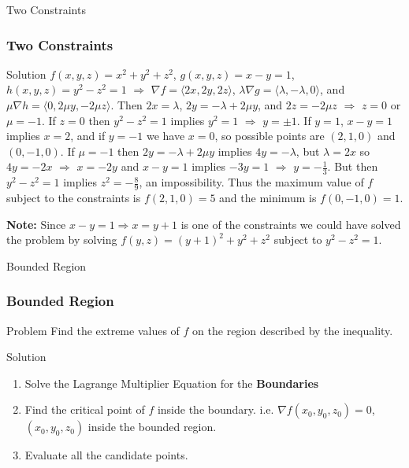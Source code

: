 \documentclass[aspectratio=169, UTF8]{beamer}
\begin{document}
\begin{frame}{Two Constraints}
    \frametitle{Two Constraints}
    \begin{block}{Solution}
        $f(x, y, z) = x^2 + y^2 + z^2$, $g(x, y, z) = x - y = 1$, $h(x, y, z) = y^2 - z^2 = 1$ $\Rightarrow$ $\nabla f = \langle 2x, 2y, 2z \rangle$, $\lambda \nabla g = \langle \lambda, -\lambda, 0 \rangle$, and $\mu \nabla h = \langle 0, 2\mu y, -2\mu z \rangle$. Then $2x = \lambda$, $2y = -\lambda + 2\mu y$, and $2z = -2\mu z$ $\Rightarrow$ $z = 0$ or $\mu = -1$.
If $z = 0$ then $y^2 - z^2 = 1$ implies $y^2 = 1$ $\Rightarrow$ $y = \pm 1$. If $y = 1$, $x - y = 1$ implies $x = 2$, and if $y = -1$ we have $x = 0$, so possible points are $(2, 1, 0)$ and $(0, -1, 0)$. If $\mu = -1$ then $2y = -\lambda + 2\mu y$ implies $4y = -\lambda$, but $\lambda = 2x$ so $4y = -2x$ $\Rightarrow$ $x = -2y$ and $x - y = 1$ implies $-3y = 1$ $\Rightarrow$ $y = -\frac{1}{3}$. But then $y^2 - z^2 = 1$ implies $z^2 = -\frac{8}{9}$, an impossibility. Thus the maximum value of $f$ subject to the constraints is $f(2, 1, 0) = 5$ and the minimum is $f(0, -1, 0) = 1$.

\vspace{1em} %

\textbf{Note:} Since $x - y = 1 \Rightarrow x = y + 1$ is one of the constraints we could have solved the problem by solving $f(y, z) = (y + 1)^2 + y^2 + z^2$ subject to $y^2 - z^2 = 1$.
    \end{block}
\end{frame}
\begin{frame}{Bounded Region}
    \frametitle{Bounded Region}
    \begin{block}{Problem}
        Find the extreme values of $f$ on the region described by the inequality.
    \end{block}
    \begin{block}{Solution}
        \begin{enumerate}
            \item Solve the Lagrange Multiplier Equation for the \textbf{Boundaries}
            \item Find the critical point of $f$ inside the boundary. i.e. $\nabla f(x_0, y_0, z_0) = 0$, $(x_0,y_0,z_0)$ inside the bounded region.
            \item Evaluate all the candidate points.
        \end{enumerate}
    \end{block}
\end{frame}
\end{document}
